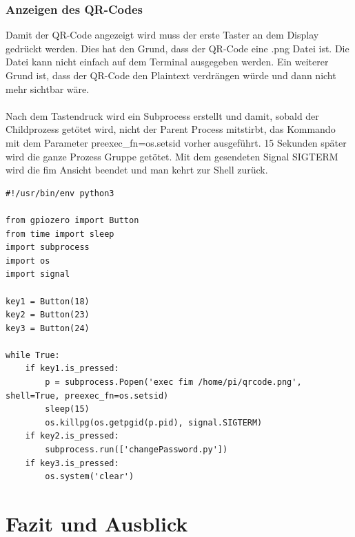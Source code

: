 \documentclass[a4paper,11pt,singlespacing]{article}
\begin{document}
    		\subsubsection{Anzeigen des QR-Codes}
    		\label{sec:Anzeigen_des_QR-Codes}
    			Damit der QR-Code angezeigt wird muss der erste Taster an dem Display gedrückt werden. Dies hat den Grund, dass der QR-Code eine .png Datei ist. Die Datei kann nicht einfach auf dem Terminal ausgegeben werden. Ein weiterer Grund ist, dass der QR-Code den Plaintext verdrängen würde und dann nicht mehr sichtbar wäre. \\ \\
    			Nach dem Tastendruck wird ein Subprocess erstellt und damit, sobald der Childprozess getötet wird, nicht der Parent Process mitstirbt, das Kommando mit dem Parameter preexec\_fn=os.setsid vorher ausgeführt. 15 Sekunden später wird die ganze Prozess Gruppe getötet. Mit dem gesendeten Signal SIGTERM wird die fim Ansicht beendet und man kehrt zur Shell zurück. \\ 
    			\begin{lstlisting}
#!/usr/bin/env python3

from gpiozero import Button
from time import sleep
import subprocess
import os
import signal

key1 = Button(18)
key2 = Button(23)
key3 = Button(24)

while True:
	if key1.is_pressed:
		p = subprocess.Popen('exec fim /home/pi/qrcode.png', shell=True, preexec_fn=os.setsid)
		sleep(15)
		os.killpg(os.getpgid(p.pid), signal.SIGTERM)
	if key2.is_pressed:
		subprocess.run(['changePassword.py'])
	if key3.is_pressed:
		os.system('clear')
    			\end{lstlisting}
    
    \section{Fazit und Ausblick}
\end{document}
